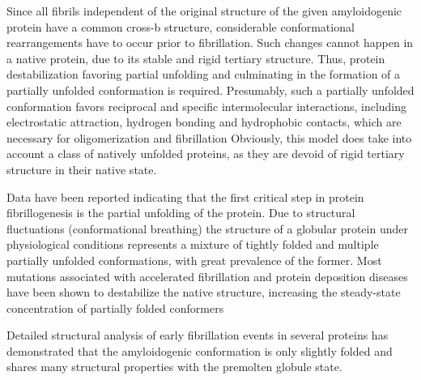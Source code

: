 Since all fibrils independent of the original structure of the given amyloidogenic protein have a common cross-b structure, considerable conformational rearrangements have to occur prior to fibrillation. 
Such changes cannot happen in a native protein, due to its stable and rigid tertiary structure. Thus, protein destabilization favoring partial unfolding and culminating in the formation of a partially unfolded conformation is required. 
Presumably, such a partially unfolded conformation favors reciprocal and specific intermolecular interactions, including electrostatic attraction, hydrogen bonding and hydrophobic contacts, which are necessary for oligomerization and fibrillation
Obviously, this model does take into account a class of natively unfolded proteins, as they are devoid of rigid tertiary structure in their native state.

Data have been reported indicating that the first critical step in protein fibrillogenesis is the partial unfolding of the protein. 
Due to structural fluctuations (conformational breathing) the structure of a globular protein under physiological conditions represents a mixture of tightly folded and multiple partially unfolded conformations, 
with great prevalence of the former. 
Most mutations associated with accelerated fibrillation and protein deposition diseases have been shown to destabilize the native structure, increasing the steady-state concentration of partially folded conformers

Detailed structural analysis of early fibrillation events in several proteins has demonstrated that the amyloidogenic conformation is only slightly folded and shares many structural properties with the premolten globule state.

